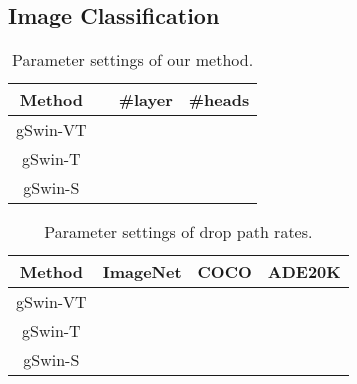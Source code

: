 \documentclass{article}
\begin{document}
\subsection{Image Classification}
\begin{table}[!t]
	\centering
    {
	\begin{tabular}{cccc}
        \toprule
        Method &  & \#layer & \#heads \\
        \midrule
        gSwin-VT &  &  &  \\
    	gSwin-T  &  &  & \\
    	gSwin-S  &  &  & \\
    	\bottomrule
    \end{tabular}
    }
	\caption{
		Parameter settings of our method.
	}
    \label{label:013}
\end{table}
\begin{table}[!t]
	\centering
    {
	\begin{tabular}{cccc}
        \toprule
        Method & ImageNet & COCO & ADE20K \\
        \midrule
        gSwin-VT &  &  &  \\
    	gSwin-T  &  &  & \\
    	gSwin-S  &  &  & \\
    	\bottomrule
    \end{tabular}
    }
	\caption{
		Parameter settings of drop path rates.
	}
    \label{label:014}
\end{table}
\end{document}
